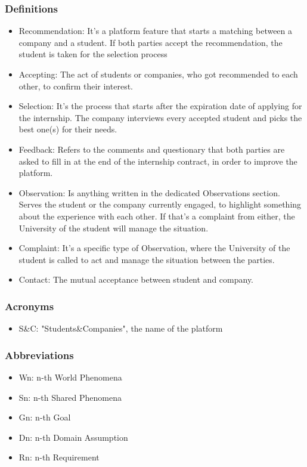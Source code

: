 \documentclass{article}
\begin{document}
\subsubsection{Definitions}
    \begin{itemize}
        \item Recommendation: It's a platform feature that starts a matching between a company and a student. If both parties accept the recommendation, the student is taken for the selection process
        \item Accepting: The act of students or companies, who got recommended to each other, to confirm their interest. 
        \item Selection: It's the process that starts after the expiration date of applying for the internship. The company interviews every accepted student and picks the best one(s) for their needs. 
        \item Feedback: Refers to the comments and questionary that both parties are asked to fill in at the end of the internship contract, in order to improve the platform.
        \item Observation: Is anything written in the dedicated Observations section. Serves the student or the company currently engaged, to highlight something about the experience with each other. If that's a complaint from either, the University of the student will manage the situation.
        \item Complaint: It's a specific type of Observation, where the University of the student is called to act and manage the situation between the parties.
        \item Contact: The mutual acceptance between student and company.
    \end{itemize}
\subsubsection{Acronyms}
    \begin{itemize}
        \item S\&C: "Students\&Companies", the name of the platform
    \end{itemize}
\subsubsection{Abbreviations}
    \begin{itemize}
        \item Wn: n-th World Phenomena
        \item Sn: n-th Shared Phenomena
        \item Gn: n-th Goal
        \item Dn: n-th Domain Assumption
        \item Rn: n-th Requirement
    \end{itemize}
\end{document}

